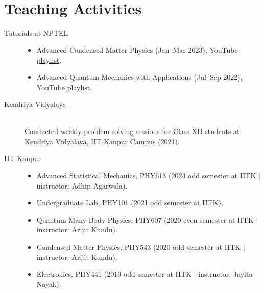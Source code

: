 \documentclass[a4paper,11pt]{article}
\begin{document}
\section*{Teaching Activities}
\begin{description}
	\item[Tutorials at NPTEL] 
		\indent
\begin{itemize}[itemsep=-0.6em, topsep=0em]
	\item Advanced Condensed Matter Physics (Jan--Mar 2023), {\color{mycol1}\href{https://www.youtube.com/watch?v=E1hOlqM3F6c&list=PLTCElzvohMxJcWDdKVuuSG8QGSLWd6E79}{YouTube playlist}}.
	\item Advanced Quantum Mechanics with Applications (Jul--Sep 2022), {\color{mycol1}\href{https://www.youtube.com/watch?v=RC1Cryei68A&list=PLTCElzvohMxLPXuP3ZIPgb4gIe1go4s3r}{YouTube playlist}}.
\end{itemize}
\item[Kendriya Vidyalaya]
	\indent\\
Conducted weekly problem-solving sessions for Class XII students at Kendriya Vidyalaya, IIT Kanpur Campus (2021).
\item[IIT Kanpur]
	\indent
\begin{itemize}[itemsep=-0.6em, topsep=0em]
	\item {Advanced Statistical Mechanics}, {PHY613} (2024 odd semester at IITK $\vert$ instructor: Adhip Agarwala).
	\item {Undergraduate Lab}, {PHY101} (2021 odd semester at IITK).
	\item {Quantum Many-Body Physics}, {PHY607} (2020 even semester at IITK $\vert$ instructor: Arijit Kundu).
	\item  {Condensed Matter Physics}, {PHY543} (2020 odd semester at IITK $\vert$ instructor: Arijit Kundu).
	\item  {Electronics}, {PHY441} (2019 odd semester at IITK $\vert$ instructor: Jayita Nayak).
\end{itemize}
\end{description}
\end{document}
